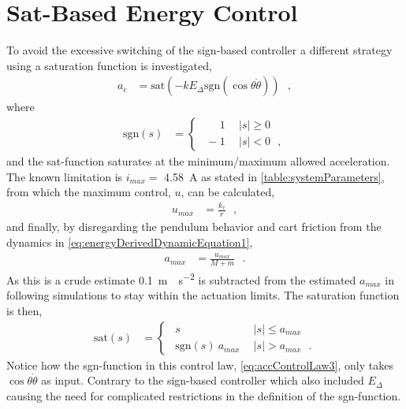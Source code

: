 \section{Sat-Based Energy Control}
To avoid the excessive switching of the sign-based controller a different strategy using a saturation function is investigated,
\begin{align}
  a_c &= \mathrm{sat}(-k E_\Delta \mathrm{sgn}(\cos \theta \dot{\theta}))  \ \ \ ,   \label{eq:accControlLaw3} 
\end{align}
where 
\begin{align}
\mathrm{sgn}( s ) &=
\begin{cases}
\ \ \phantom{-}1 & \ \  | s |  \geq 0 \\
\ \           -1 & \ \  | s |  <    0 \ \ \ ,
\end{cases}
\label{eq:sgnFunction1}
\end{align}
and the sat-function saturates at the minimum/maximum allowed acceleration. The known limitation is $i_{max} =$ \SI{4.58}{A} as stated in \autoref{table:systemParameters}, from which the maximum control, $u$, can be calculated,
\begin{align}
  u_{max} &=  \frac{k_{\tau}}{r} \ \ \ ,    \label{eq:maxU} 
\end{align}
and finally, by disregarding the pendulum behavior and cart friction from the dynamics in \autoref{eq:energyDerivedDynamicEquation1},
\begin{align}
  a_{max} &= \frac{u_{max}}{M+m} \ \ \ .   \label{eq:maxAcc} 
\end{align}
As this is a crude estimate \SI{0.1}{m\cdot s^{-2}} is subtracted from the estimated $a_{max}$ in following simulations to stay within the actuation limits. The saturation function is then,
\begin{align}
  \text{sat}(s) &=
  \begin{cases}
    \ \ s                           & \ \  | s |  \leq a_{max} \\
    \ \ \mathrm{sgn}( s )\ a_{max}  & \ \  | s |  >  a_{max} \ \ \ .
  \end{cases}
  \label{eq:satuationFunction}
\end{align}
Notice how the sgn-function in this control law, \autoref{eq:accControlLaw3}, only takes $\cos \theta \dot{\theta}$ as input. Contrary to the sign-based controller which also included $E_\Delta$ causing the need for complicated restrictions in the definition of the sgn-function.

